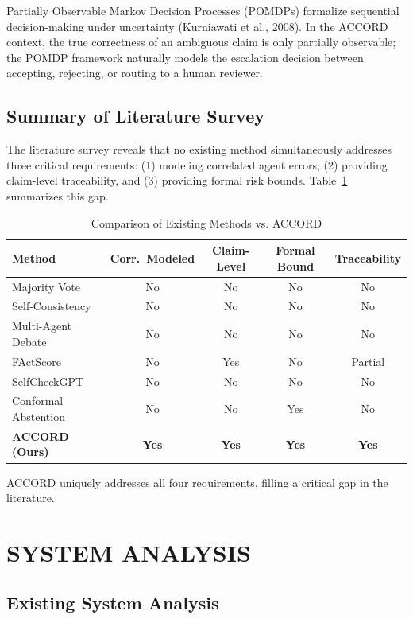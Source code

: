\documentclass[12pt,a4paper]{report}
\begin{document}
Partially Observable Markov Decision Processes (POMDPs) formalize sequential decision-making under uncertainty (Kurniawati et al., 2008). In the ACCORD context, the true correctness of an ambiguous claim is only partially observable; the POMDP framework naturally models the escalation decision between accepting, rejecting, or routing to a human reviewer.

\section{Summary of Literature Survey}

The literature survey reveals that no existing method simultaneously addresses three critical requirements: (1) modeling correlated agent errors, (2) providing claim-level traceability, and (3) providing formal risk bounds. Table~\ref{tab:literature_comparison} summarizes this gap.

\begin{table}[htbp]
\centering
\caption{Comparison of Existing Methods vs. ACCORD}
\label{tab:literature_comparison}
\begin{tabular}{lcccc}
\toprule
Method & Corr.\ Modeled & Claim-Level & Formal Bound & Traceability \\
\midrule
Majority Vote & No & No & No & No \\
Self-Consistency & No & No & No & No \\
Multi-Agent Debate & No & No & No & No \\
FActScore & No & Yes & No & Partial \\
SelfCheckGPT & No & No & No & No \\
Conformal Abstention & No & No & Yes & No \\
\textbf{ACCORD (Ours)} & \textbf{Yes} & \textbf{Yes} & \textbf{Yes} & \textbf{Yes} \\
\bottomrule
\end{tabular}
\end{table}

ACCORD uniquely addresses all four requirements, filling a critical gap in the literature.

\chapter{SYSTEM ANALYSIS}

\section{Existing System Analysis}
\end{document}
